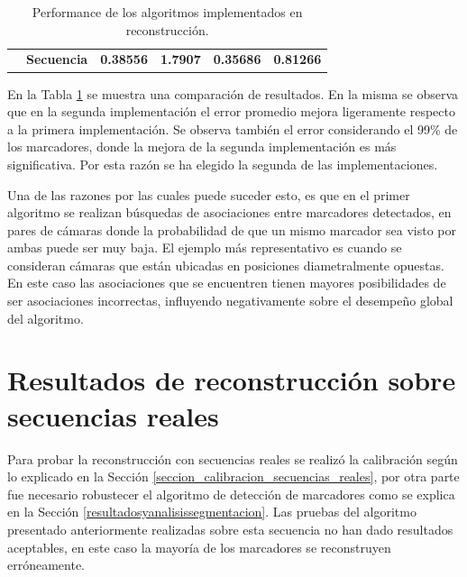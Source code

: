 \begin{table}[ht!]
{\begin{tabular}{cc|c|c|c|c|}
\multicolumn{1}{l|}{}                                                         & \textbf{Secuencia }                                            & \textbf{0.38556 }                                                         & \textbf{1.7907    }                                                    & \textbf{0.35686}                                                         &\textbf{ 0.81266}                                                       \\ \cline{2-6} 
\end{tabular}
}
\caption{Performance de los algoritmos implementados en reconstrucción. }
\label{table_performance_reconstruccion}
\end{table}

En la Tabla \ref{table_performance_reconstruccion} se muestra una comparación de resultados. En la misma se observa que en la segunda  implementación el error promedio mejora ligeramente respecto a la primera implementación. Se observa también el error considerando el 99\% de los marcadores, donde la mejora de la segunda implementación es más significativa. Por esta razón se ha elegido la segunda de las implementaciones.


Una de las razones por las cuales puede suceder esto, es que en el primer algoritmo se realizan búsquedas de asociaciones entre marcadores detectados, en pares de cámaras donde la probabilidad de que un mismo marcador sea visto por ambas puede ser muy baja. El ejemplo más representativo es cuando se consideran cámaras que están  ubicadas en posiciones diametralmente opuestas. En este caso las asociaciones que se encuentren tienen mayores posibilidades de ser asociaciones incorrectas, influyendo negativamente sobre el desempeño global del algoritmo. 



\section{Resultados de reconstrucción sobre secuencias reales}

Para probar la reconstrucción con secuencias reales se realizó la calibración según lo explicado en la Sección \ref{seccion_calibracion_secuencias_reales}, por otra parte fue necesario robustecer el algoritmo de detección de marcadores como se explica en la Sección \ref{resultadosyanalisissegmentacion}. Las pruebas del algoritmo presentado anteriormente realizadas sobre esta secuencia no han dado resultados aceptables, en este caso la mayoría de los marcadores se reconstruyen erróneamente. 


